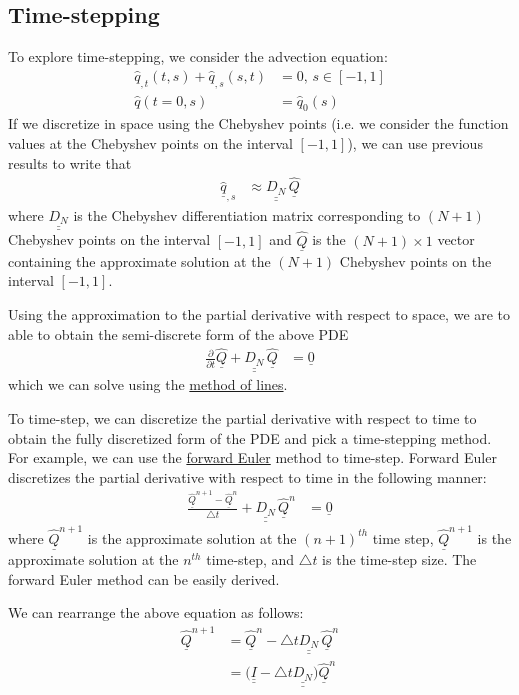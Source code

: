 \documentclass[12pt]{article}
\newcommand{\bunderline}[1]{\underline{#1}}
\renewcommand{\vec}[1]{{\bunderline{#1}}}
\newcommand{\mat}[1]{{\bunderline{\bunderline{#1}}}}
\begin{document}
\subsection*{Time-stepping}
To explore time-stepping, we consider the advection equation:
\begin{align*}
	\hat{q}_{, t}(t, s) + \hat{q}_{, s}(s, t) & = 0, \, s \in [-1, 1] \\
	\hat{q}(t = 0, s) & = \hat{q}_{0}(s)
\end{align*}
If we discretize in space using the Chebyshev points (i.e. we consider the function values at the Chebyshev points on the interval $[-1, 1]$), we can use previous results to write that
\begin{align*}
	\hat{\vec{q}}_{, s} & \approx \mat{D_{N}} \, \hat{\vec{Q}}
\end{align*}
where $\mat{D_{N}}$ is the Chebyshev differentiation matrix corresponding to $(N + 1)$ Chebyshev points on the interval $[-1, 1]$ and $\hat{\vec{Q}}$ is the $(N+1) \times 1$ vector containing the approximate solution at the $(N + 1)$ Chebyshev points on the interval $[-1, 1]$.
\par 
Using the approximation to the partial derivative with respect to space, we are to able to obtain the semi-discrete form of the above PDE
\begin{align*}
	\frac{\partial}{\partial t} \hat{\vec{Q}} + \mat{D_{N}} \, \hat{\vec{Q}} & = \vec{0}
\end{align*}
which we can solve using the \underline{method of lines}.
\par 
To time-step, we can discretize the partial derivative with respect to time to obtain the fully discretized form of the PDE and pick a time-stepping method.
For example, we can use the \underline{forward Euler} method to time-step.
Forward Euler discretizes the partial derivative with respect to time in the following manner:
\begin{align*}
	\frac{\hat{\vec{Q}}^{n+1} - \hat{\vec{Q}}^{n}}{\triangle t} + \mat{D_{N}} \, \hat{\vec{Q}}^{n} & = \vec{0}
\end{align*}
where $\hat{\vec{Q}}^{n+1}$ is the approximate solution at the $(n+1)^{th}$ time step,  $\hat{\vec{Q}}^{n+1}$ is the approximate solution at the $n^{th}$ time-step, and $\triangle t$ is the time-step size. The forward Euler method can be easily derived.
\par 
We can rearrange the above equation as follows:
\begin{align*}
	\hat{\vec{Q}}^{n+1} & = \hat{\vec{Q}}^{n} - \triangle t \mat{D_{N}} \, \hat{\vec{Q}}^{n} \\
						& = \Big( \mat{I} - \triangle t  \mat{D_{N}} \Big) \hat{\vec{Q}}^{n}
\end{align*}
\end{document}
